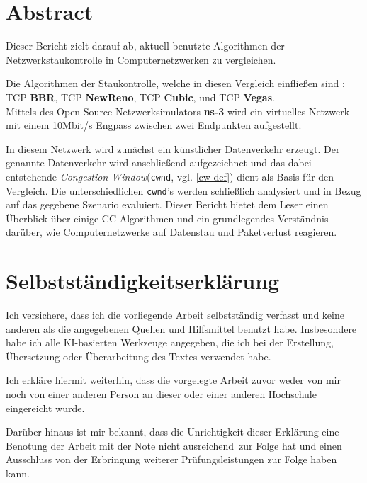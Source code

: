 \documentclass[paper=a4,fontsize=12pt,ngerman]{scrartcl}
\begin{document}
\pagestyle{plain}





\section*{Abstract}



Dieser Bericht zielt darauf ab, aktuell benutzte Algorithmen der Netzwerkstaukontrolle in Computernetzwerken 
zu vergleichen.

Die Algorithmen der Staukontrolle, welche in diesen Vergleich einfließen sind : TCP \textbf{BBR},
TCP \textbf{NewReno}, TCP \textbf{Cubic}, und TCP \textbf{Vegas}.  \\
Mittels des Open-Source Netzwerksimulators \textbf{ns-3}\cite{ns3-simu} wird ein virtuelles Netzwerk mit einem 10Mbit/s Engpass zwischen zwei Endpunkten aufgestellt. 

In diesem Netzwerk wird zunächst ein künstlicher Datenverkehr erzeugt.
Der genannte Datenverkehr wird anschließend aufgezeichnet und das dabei entstehende \textit{Congestion Window}(\texttt{cwnd}, vgl. \ref{cw-def}) dient als Basis für den Vergleich.
Die unterschiedlichen \texttt{cwnd}'s werden schließlich analysiert und in Bezug auf das gegebene Szenario evaluiert.
Dieser Bericht bietet dem Leser einen Überblick über einige CC-Algorithmen und ein grundlegendes Verständnis darüber, wie Computernetzwerke auf Datenstau und 
Paketverlust reagieren.




\newpage
\section*{Selbstständigkeitserklärung}
Ich versichere, dass ich die vorliegende Arbeit selbstständig verfasst und 
keine anderen als die angegebenen Quellen und Hilfsmittel benutzt habe.
Insbesondere habe ich alle KI-basierten Werkzeuge angegeben, die ich bei
der Erstellung, Übersetzung oder Überarbeitung des Textes verwendet habe.

Ich erkläre hiermit weiterhin, dass die vorgelegte Arbeit zuvor weder von mir 
noch von einer anderen Person an dieser oder einer anderen Hochschule 
eingereicht wurde.

Darüber hinaus ist mir bekannt, dass die Unrichtigkeit dieser Erklärung eine 
Benotung der Arbeit mit der Note \glqq nicht ausreichend\grqq \ zur Folge hat 
und einen Ausschluss von der Erbringung weiterer Prüfungsleistungen zur Folge 
haben kann.
\bigskip
 
\end{document}
